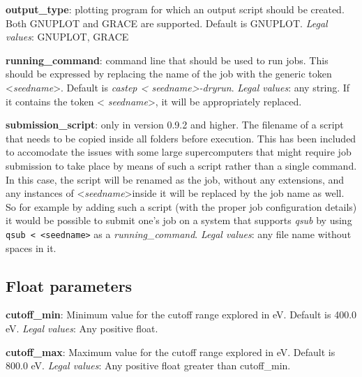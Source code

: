\documentclass[10pt]{article}
\begin{document}
\textbf{output\_type}: plotting program for which an output script should be 
created. Both GNUPLOT and GRACE are supported. Default is GNUPLOT.\newline
\textit{Legal values}: GNUPLOT, GRACE\newline

\textbf{running\_command}: command line that should be used to run jobs. This 
should be expressed by replacing the name of the job with the generic token 
\textless \textit{seedname}\textgreater. Default is \textit{castep \textless 
seedname\textgreater -dryrun}.\newline
\textit{Legal values}: any string. If it contains the token \textless 
\textit{seedname}\textgreater, it will be appropriately replaced.\newline

\textbf{submission\_script}: only in version 0.9.2 and higher. The filename of a 
script that needs to be copied inside all folders before execution. This has 
been included to accomodate the issues with some large supercomputers that might 
require job submission to take place by means of such a script rather than a 
single command. In this case, the script will be renamed as the job, without any 
extensions, and any instances of \textless \textit{seedname}\textgreater inside 
it will be replaced by the job name as well. So for example by adding such a 
script (with the proper job configuration details) it would be possible to 
submit one's job on a system that supports \textit{qsub} by using \texttt{qsub 
\textless~\textless seedname\textgreater} as a 
\textit{running\_command}.\newline
\textit{Legal values}: any file name without spaces in it.

\subsection{Float parameters}

\textbf{cutoff\_min}: Minimum value for the cutoff range explored in eV. Default 
is 400.0 eV.\newline
\textit{Legal values}: Any positive float.\newline

\textbf{cutoff\_max}: Maximum value for the cutoff range explored in eV. Default 
is 800.0 eV.\newline
\textit{Legal values}: Any positive float greater than cutoff\_min.\newline
\end{document}
